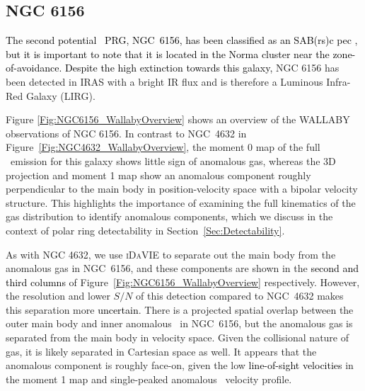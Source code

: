 \documentclass[fleqn,usenatbib]{mnras}
\newcommand{\kms}{\textrm{km s}^{-1}}
\newcommand{\hi}{\text{H\,\sc{i}}}
\newcommand{\KS}[1]{\textcolor{black}{#1}}
\begin{document}
\subsection{NGC 6156}

\textcolor{black}{The second potential \hi\ PRG, NGC~6156,} 
\textcolor{black}{has been classified as an SAB(rs)c pec \citep{deVaucouleurs1991}, but it is important to note that it is located in the Norma cluster near the zone-of-avoidance.
Despite the high extinction towards this galaxy,} NGC 6156 has been detected in IRAS \textcolor{black}{\citep{Sanders2003}} with a bright IR flux and is therefore a Luminous Infra-Red Galaxy (LIRG). 


Figure \ref{Fig:NGC6156_WallabyOverview} shows an overview of the WALLABY observations of NGC 6156. In contrast to NGC~4632 in Figure~\ref{Fig:NGC4632_WallabyOverview}, the moment 0 map of the full \hi\ emission for this galaxy shows little sign of anomalous gas, whereas the 3D projection and moment 1 map show an anomalous component roughly perpendicular to the main body in position-velocity space with a bipolar velocity structure. This highlights the importance of examining the full kinematics of the gas distribution to identify anomalous components, which we discuss in the context of polar ring detectability in Section~\ref{Sec:Detectability}.  

As with NGC 4632, we use \textsc{iDaVIE} to separate out the main body from the anomalous gas in NGC~6156, and these components are shown in the \textcolor{black}{second and third columns} of Figure~\ref{Fig:NGC6156_WallabyOverview} respectively.  However, the resolution and lower $S/N$ of this detection compared to NGC~4632 makes this separation more \textcolor{black}{uncertain}. There is a projected spatial overlap between the outer main body and inner anomalous \hi\ in NGC~6156, but the anomalous gas is separated from the main body in velocity space.  Given the collisional nature of gas, it is likely separated in Cartesian space as well. It appears that the anomalous component is roughly face-on, given the low \KS{line-of-sight velocities} in the moment 1 map and single-peaked anomalous \hi\ velocity profile. 
\end{document}
